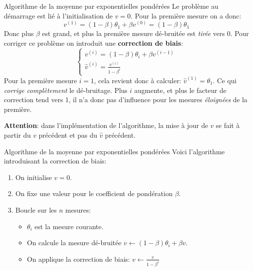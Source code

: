 \begin{frame}{Algorithme de la moyenne par exponentielles pondérées}
	Le problème au démarrage est lié à l'initialisation de $v = 0$. Pour la première mesure on a donc:
	\begin{equation*}
		v^{(1)} = (1 - \beta) \theta_1 + \beta v^{(0)} = (1 - \beta) \theta_1
	\end{equation*}
	Donc plus $\beta$ est grand, et plus la première mesure dé-bruitée est \textit{tirée} vers 0. Pour corriger ce problème on introduit une \textbf{correction de biais}:
	\pause
	\begin{equation*}
		\begin{cases}
			v^{(i)} = (1 - \beta) \theta_i + \beta v^{(i-1)} \\
			\hat{v}^{(i)} = \displaystyle \frac{v^{(i)}}{1 - \beta^i}
		\end{cases}
	\end{equation*}
	\pause
	Pour la première mesure $i = 1$, cela revient donc à calculer: $\hat{v}^{(1)} = \theta_1$. Ce qui \textit{corrige complètement} le dé-bruitage. Plus $i$ augmente, et plus le facteur de correction tend vers 1, il n'a donc pas d'influence pour les mesures \textit{éloignées} de la première.
	
	\vspace{0.2cm}
	
	\textbf{Attention}: dans l'implémentation de l'algorithme, la mise à jour de $v$ se fait à partir du $v$ précédent et pas du $\hat{v}$ précédent.
\end{frame}

\begin{frame}{Algorithme de la moyenne par exponentielles pondérées}
	Voici l'algorithme introduisant la correction de biais:
	\begin{enumerate}
		\item On initialise $v = 0$.
		\item On fixe une valeur pour le coefficient de pondération $\beta$.
		\item Boucle sur les $n$ mesures:
		\begin{itemize}
			\item $\theta_i$ est la mesure courante.
			\item On calcule la mesure dé-bruitée $v \leftarrow (1 - \beta) \theta_i + \beta v$.
			\item On applique la correction de biais: $\hat{v} \leftarrow \frac{v}{1 - \beta^i}$
		\end{itemize}
	\end{enumerate}
\end{frame}

